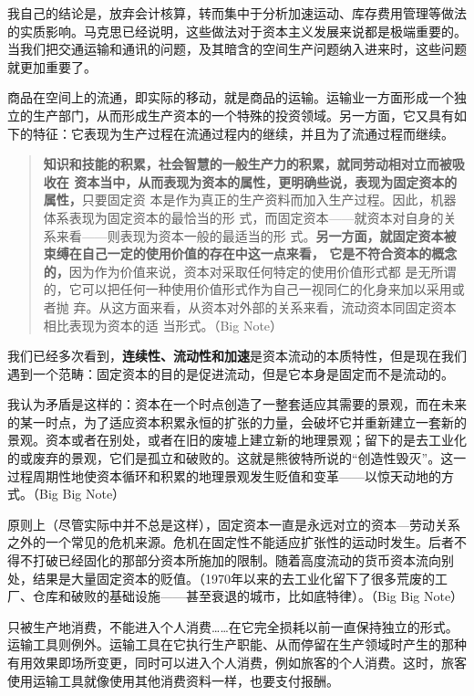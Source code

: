 我自己的结论是，放弃会计核算，转而集中于分析加速运动、库存费用管理等做法的实质影响。马克思已经说明，这些做法对于资本主义发展来说都是极端重要的。当我们把交通运输和通讯的问题，及其暗含的空间生产问题纳入进来时，这些问题就更加重要了。

商品在空间上的流通，即实际的移动，就是商品的运输。运输业一方面形成一个独立的生产部门，从而形成生产资本的一个特殊的投资领域。另一方面，它又具有如下的特征：它表现为生产过程在流通过程内的继续，并且为了流通过程而继续。 

\begin{quotation}
  \textbf{知识和技能的积累，社会智慧的一般生产力的积累，就同劳动相对立而被吸收在
    资本当中，从而表现为资本的属性，更明确些说，表现为固定资本的属性，}只要固定资
  本是作为真正的生产资料而加入生产过程。因此，机器体系表现为固定资本的最恰当的形
  式，而固定资本——就资本对自身的关系来看——则表现为资本一般的最适当的形
  式。\textbf{另一方面，就固定资本被束缚在自己一定的使用价值的存在中这一点来看，
    它是不符合资本的概念的，}因为作为价值来说，资本对采取任何特定的使用价值形式都
  是无所谓的，它可以把任何一种使用价值形式作为自己一视同仁的化身来加以采用或者抛
  弃。从这方面来看，从资本对外部的关系来看，流动资本同固定资本相比表现为资本的适
  当形式。（Big Note）

\end{quotation}

我们已经多次看到，\textbf{连续性、流动性和加速}是资本流动的本质特性，但是现在我们
遇到一个范畴：固定资本的目的是促进流动，但是它本身是固定而不是流动的。

我认为矛盾是这样的：资本在一个时点创造了一整套适应其需要的景观，而在未来的某一时点，为了适应资本积累永恒的扩张的力量，会破坏它并重新建立一套新的景观。资本或者在别处，或者在旧的废墟上建立新的地理景观；留下的是去工业化的或废弃的景观，它们是孤立和破败的。这就是熊彼特所说的“创造性毁灭”。这一过程周期性地使资本循环和积累的地理景观发生贬值和变革——以惊天动地的方式。（Big Big Note）

原则上（尽管实际中并不总是这样），固定资本一直是永远对立的资本—劳动关系之外的一个常见的危机来源。危机在固定性不能适应扩张性的运动时发生。后者不得不打破已经固化的那部分资本所施加的限制。随着高度流动的货币资本流向别处，结果是大量固定资本的贬值。（1970年以来的去工业化留下了很多荒废的工厂、仓库和破败的基础设施——甚至衰退的城市，比如底特律）。（Big Big Note）

只被生产地消费，不能进入个人消费……在它完全损耗以前一直保持独立的形式。运输工具则例外。运输工具在它执行生产职能、从而停留在生产领域时产生的那种有用效果即场所变更，同时可以进入个人消费，例如旅客的个人消费。这时，旅客使用运输工具就像使用其他消费资料一样，也要支付报酬。 

